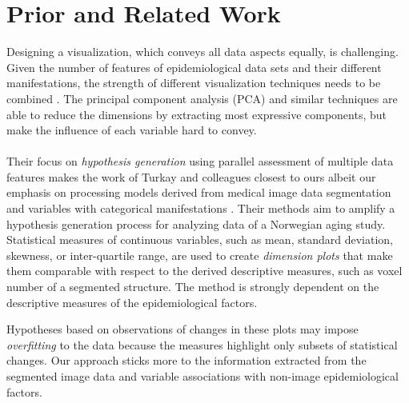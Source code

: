\documentclass[journal]{style/vgtc} 			          %
\begin{document}
\section{Prior and Related Work}
Designing a visualization, which conveys all data aspects equally, is challenging.
%
Given the number of features of epidemiological data sets and their different manifestations, the strength of different visualization techniques needs to be combined \cite{Buja91, Konyha2009}.
%
The principal component analysis (PCA) and similar techniques are able to reduce the dimensions by extracting most expressive components, but make the influence of each variable hard to convey.
\\\\
Their focus on \emph{hypothesis generation} using parallel assessment of multiple data features makes the work of Turkay and colleagues closest to ours albeit our emphasis on processing models derived from medical image data segmentation and variables with categorical manifestations \cite{Turkay2013}.
%
Their methods aim to amplify a hypothesis generation process for analyzing data of a Norwegian aging study.
%
Statistical measures of continuous variables, such as mean, standard deviation, skewness, or inter-quartile range, are used to create \emph{dimension plots} that make them comparable with respect to the derived descriptive measures, such as voxel number of a segmented structure.
%
%
%
%
%
The method is strongly dependent on the descriptive measures of the epidemiological factors.

Hypotheses based on observations of changes in these plots may impose \emph{overfitting} to the data because the measures highlight only subsets of statistical changes.
%
Our approach sticks more to the information extracted from the segmented image data and variable associations with non-image epidemiological factors.
\end{document}
